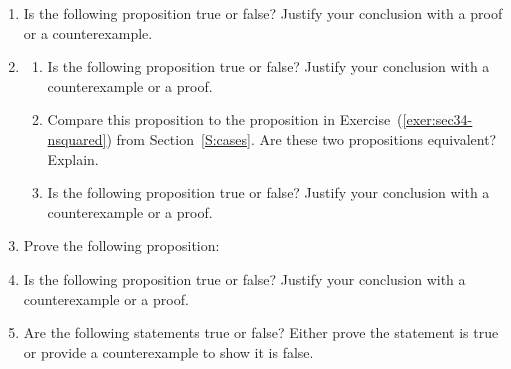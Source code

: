 \begin{enumerate}
\item Is the following proposition true or false?  Justify your conclusion with a proof or a counterexample.

\item \label{exer:sec34-new9}\begin{enumerate}
\item Is the following proposition true or false?  Justify your conclusion with a counterexample or a proof. 


\item Compare this proposition to the proposition in Exercise~(\ref{exer:sec34-nsquared}) from Section~\ref{S:cases}.  Are these two propositions equivalent? Explain.
\item Is the following proposition true or false?  Justify your conclusion with a counterexample or a proof.

\end{enumerate}

\item Prove the following proposition:

\item Is the following proposition true or false?  Justify your conclusion with a counterexample or a proof.
\label{exer:case-ind}%

\item Are the following statements true or false?  Either prove the statement is true or provide a counterexample to show it is false.
\label{exer:falsecongruence}%


\end{enumerate}
